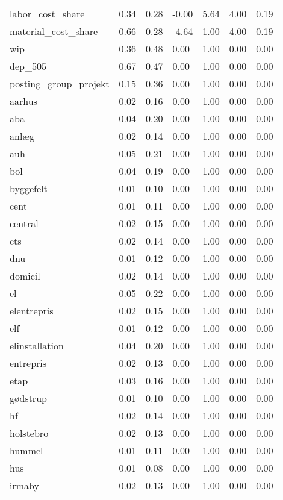 \begin{landscape}
\begin{longtable}[h!]{lllllll}
labor_cost_share & 0.34 & 0.28 & -0.00 & 5.64 & 4.00 & 0.19 \\
material_cost_share & 0.66 & 0.28 & -4.64 & 1.00 & 4.00 & 0.19 \\
wip & 0.36 & 0.48 & 0.00 & 1.00 & 0.00 & 0.00 \\
dep_505 & 0.67 & 0.47 & 0.00 & 1.00 & 0.00 & 0.00 \\
posting_group_projekt & 0.15 & 0.36 & 0.00 & 1.00 & 0.00 & 0.00 \\
aarhus & 0.02 & 0.16 & 0.00 & 1.00 & 0.00 & 0.00 \\
aba & 0.04 & 0.20 & 0.00 & 1.00 & 0.00 & 0.00 \\
anlæg & 0.02 & 0.14 & 0.00 & 1.00 & 0.00 & 0.00 \\
auh & 0.05 & 0.21 & 0.00 & 1.00 & 0.00 & 0.00 \\
bol & 0.04 & 0.19 & 0.00 & 1.00 & 0.00 & 0.00 \\
byggefelt & 0.01 & 0.10 & 0.00 & 1.00 & 0.00 & 0.00 \\
cent & 0.01 & 0.11 & 0.00 & 1.00 & 0.00 & 0.00 \\
central & 0.02 & 0.15 & 0.00 & 1.00 & 0.00 & 0.00 \\
cts & 0.02 & 0.14 & 0.00 & 1.00 & 0.00 & 0.00 \\
dnu & 0.01 & 0.12 & 0.00 & 1.00 & 0.00 & 0.00 \\
domicil & 0.02 & 0.14 & 0.00 & 1.00 & 0.00 & 0.00 \\
el & 0.05 & 0.22 & 0.00 & 1.00 & 0.00 & 0.00 \\
elentrepris & 0.02 & 0.15 & 0.00 & 1.00 & 0.00 & 0.00 \\
elf & 0.01 & 0.12 & 0.00 & 1.00 & 0.00 & 0.00 \\
elinstallation & 0.04 & 0.20 & 0.00 & 1.00 & 0.00 & 0.00 \\
entrepris & 0.02 & 0.13 & 0.00 & 1.00 & 0.00 & 0.00 \\
etap & 0.03 & 0.16 & 0.00 & 1.00 & 0.00 & 0.00 \\
gødstrup & 0.01 & 0.10 & 0.00 & 1.00 & 0.00 & 0.00 \\
hf & 0.02 & 0.14 & 0.00 & 1.00 & 0.00 & 0.00 \\
holstebro & 0.02 & 0.13 & 0.00 & 1.00 & 0.00 & 0.00 \\
hummel & 0.01 & 0.11 & 0.00 & 1.00 & 0.00 & 0.00 \\
hus & 0.01 & 0.08 & 0.00 & 1.00 & 0.00 & 0.00 \\
irmaby & 0.02 & 0.13 & 0.00 & 1.00 & 0.00 & 0.00 \\

\end{longtable}
\end{landscape}
